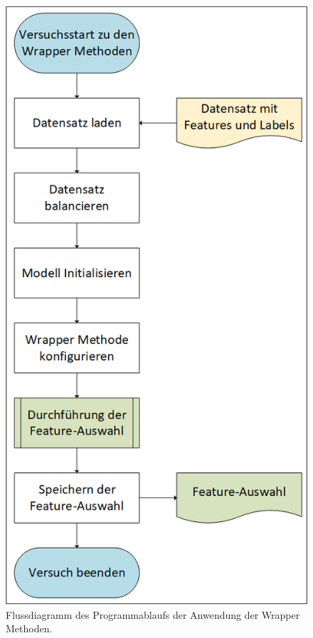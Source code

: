 \begin{figure}[p]
    \centering
    \includegraphics[height=0.9\textheight]{img/Grafiken/Flussdaigramm Versuche Wrapper Methoden.png}
    \caption{Flussdiagramm des Programmablaufs der Anwendung der Wrapper Methoden.}
    \label{fig:FlussDia Wrapper}
\end{figure}

